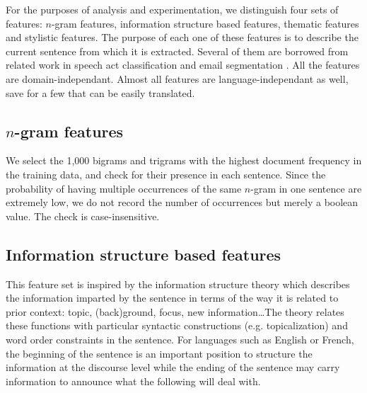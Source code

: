 For the purposes of analysis and experimentation, we distinguish four sets of features:  $n$-gram features, information structure based features, thematic features and stylistic features.
The purpose of each one of these features is to describe the current sentence from which it is extracted. 
Several of them are borrowed from related work in speech act classification \cite{qadir2011classifying} and email segmentation \cite{lampert2009segmenting}. All the features are domain-independant. Almost all features are language-independant as well, save for a few that can be easily translated.



\subsection{$n$-gram features}

We select the 1,000 bigrams and trigrams with the highest document frequency in the training data, and check for their presence in each sentence. Since the probability of having multiple occurrences of the same $n$-gram in one sentence are extremely low, we do not record the number of occurrences but merely a boolean value. The check is case-insensitive.


\subsection{Information structure based features}

This feature set is inspired by the information structure theory \cite{kruijff:1996} which 
describes the information imparted by the sentence in terms of the way it is related to prior context: topic, (back)ground, focus, new information\ldots The theory relates these functions with particular syntactic constructions (e.g. topicalization) and word order constraints in the sentence.
%
For languages such as English or French, the beginning of the sentence is an important position to structure the information at the discourse level while the ending of the sentence may carry information to announce what the following will deal with.

